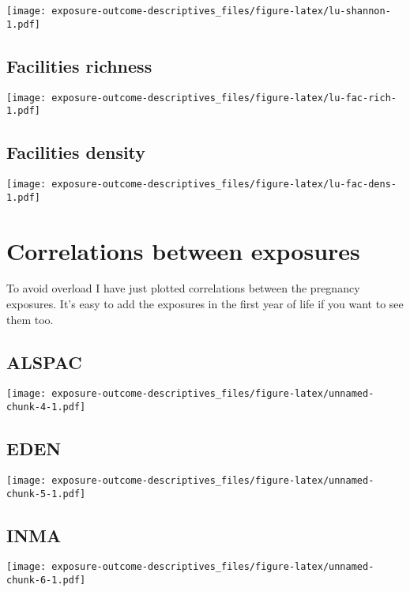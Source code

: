 \documentclass[]{article}
\begin{document}
\texttt{[image: exposure-outcome-descriptives\_files/figure-latex/lu-shannon-1.pdf]}

\hypertarget{facilities-richness}{%
\subsection{Facilities richness}\label{facilities-richness}}

\texttt{[image: exposure-outcome-descriptives\_files/figure-latex/lu-fac-rich-1.pdf]}

\hypertarget{facilities-density}{%
\subsection{Facilities density}\label{facilities-density}}

\texttt{[image: exposure-outcome-descriptives\_files/figure-latex/lu-fac-dens-1.pdf]}

\hypertarget{correlations-between-exposures}{%
\section{Correlations between exposures}\label{correlations-between-exposures}}

To avoid overload I have just plotted correlations between the pregnancy exposures. It's
easy to add the exposures in the first year of life if you want to see them too.

\hypertarget{alspac}{%
\subsection{ALSPAC}\label{alspac}}

\texttt{[image: exposure-outcome-descriptives\_files/figure-latex/unnamed-chunk-4-1.pdf]}

\hypertarget{eden}{%
\subsection{EDEN}\label{eden}}

\texttt{[image: exposure-outcome-descriptives\_files/figure-latex/unnamed-chunk-5-1.pdf]}

\hypertarget{inma}{%
\subsection{INMA}\label{inma}}

\texttt{[image: exposure-outcome-descriptives\_files/figure-latex/unnamed-chunk-6-1.pdf]}
\end{document}
